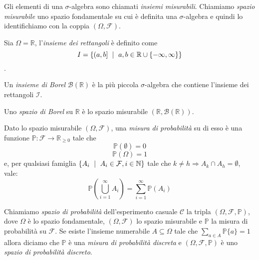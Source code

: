 Gli elementi di una $\sigma$-algebra sono chiamati \emph{insiemi misurabili}. Chiamiamo \emph{spazio misurabile} uno spazio fondamentale su cui è definita una $\sigma$-algebra e quindi lo identifichiamo con la coppia $(\Omega, \mathcal{F})$.

\begin{mtdef}
	Sia $\Omega=\mathbb{R}$, l'\emph{insieme dei rettangoli} è definito come $$ I = \{(a,b] \mbox{ }\mid\mbox{ } a,b\in \mathbb{R} \cup \{-\infty,\infty\}\} $$.
\end{mtdef}

\begin{mtdef}
	Un \emph{insieme di Borel} $\mathcal{B}(\mathbb{R})$ è la più piccola $\sigma$-algebra che contiene l'insieme dei rettangoli $\mathcal{I}$.
\end{mtdef}

\begin{mtdef}
	Uno \emph{spazio di Borel} su $\mathbb{R}$ è lo spazio misurabile $(\mathbb{R},\mathcal{B}(\mathbb{R}))$.
\end{mtdef}

\begin{mtdef}
	Dato lo spazio misurabile $(\Omega,\mathcal{F})$, una \emph{misura di probabilità} su di esso è una funzione $\mathbb{P} : \mathcal{F} \rightarrow \mathbb{R}_{\geq 0}$ tale che
	\begin{equation}
		\mathbb{P}(\emptyset) = 0
	\end{equation}
	\begin{equation}
		\mathbb{P}(\Omega) = 1
	\end{equation}
	e, per qualsiasi famiglia $\{A_i \mbox{ }\mid\mbox{ } A_i \in \mathcal{F}, i \in \mathbb{N}\}$ tale che $k \neq h \Rightarrow A_k \cap A_h = \emptyset$, vale:
	\begin{equation}
		 \mathbb{P}\left(\bigcup_{i=1}^\infty A_i\right) = \sum_{i=1}^\infty \mathbb{P}\left(A_i\right)
	\end{equation}
\end{mtdef}

Chiamiamo \emph{spazio di probabilità} dell'esperimento casuale $\mathcal{C}$ la tripla $(\Omega, \mathcal{F}, \mathbb{P})$, dove $\Omega$ è lo spazio fondamentale, $(\Omega, \mathcal{F})$ lo spazio misurabile e $\mathbb{P}$ la misura di probabilità su $\mathcal{F}$.
Se esiste l'insieme numerabile $A \subseteq \Omega$ tale che $\sum_{a \in A} \mathbb{P}\{a\} = 1$ allora diciamo che $\mathbb{P}$ è una \emph{misura di probabilità discreta} e $(\Omega, \mathcal{F}, \mathbb{P})$ è uno \emph{spazio di probabilità discreto}.

